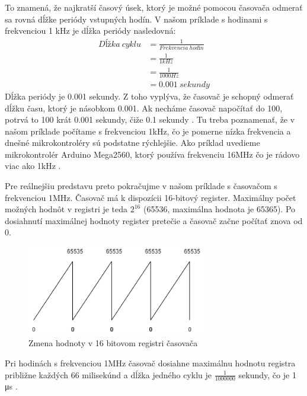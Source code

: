 To znamená, že najkratší časový úsek, ktorý je možné pomocou časovača odmerať sa
rovná dĺžke periódy vstupných hodín. V našom príklade s hodinami s frekvenciou 1 \acrshort{kHz} je dĺžka periódy nasledovná:
\begin{equation}
    \begin{aligned}
        Dĺžka\:cyklu & = \frac{1}{Frekvencia\:hodín} \\
                     & = \frac{1}{1kHz}              \\
                     & = \frac{1}{ 1000 Hz}          \\
                     & =  0.001\:sekundy
    \end{aligned}
\end{equation}
Dĺžka periódy je 0.001 sekundy. Z toho vyplýva, že časovač je schopný odmerať dĺžku času, ktorý je násobkom 0.001. Ak necháme časovač napočítať do 100, potrvá to 100 krát 0.001 sekundy, čiže 0.1 sekundy \cite{cameraNewbieGuideAVR2015}.
Tu treba poznamenať, že v našom príklade počítame s frekvenciou 1kHz, čo je pomerne nízka frekvencia a dnešné mikrokontroléry sú podstatne rýchlejšie.
Ako príklad uvedieme mikrokontrolér Arduino Mega2560, ktorý používa frekvenciu 16MHz čo je rádovo viac ako 1kHz \cite{ArduinoMega2560}.
\par Pre reálnejšiu predstavu preto pokračujme v našom príklade s časovačom s frekvenciou 1MHz. Časovač má k dispozícii 16-bitový register. Maximálny počet
možných hodnôt v registri je teda $2^{16}$ (65536, maximálna hodnota je 65365).
Po dosiahnutí maximálnej hodnoty register pretečie a časovač začne počítať znova od 0.
\begin{figure}[!h]
    \centering
    \includegraphics[width=0.70\textwidth]{img/timer.png}
    \caption{Zmena hodnoty v 16 bitovom registri časovača}
    \label{figure:timer1}
\end{figure}

Pri hodinách s frekvenciou 1MHz časovač dosiahne maximálnu hodnotu registra približne každých 66 milisekúnd a dĺžka jedného cyklu je $\frac{1}{1000000}$ sekundy, čo je 1 μs \cite{cameraNewbieGuideAVR2015}.


